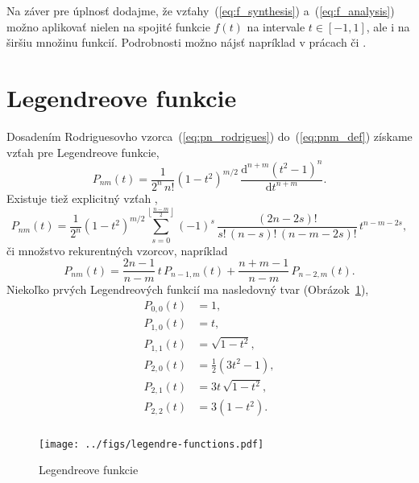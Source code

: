 \documentclass[a4paper, 12pt]{book}
\newcommand{\diff}{\mathrm d}
\begin{document}
Na záver pre úplnosť dodajme, že vzťahy~(\ref{eq:f_synthesis}) 
a~(\ref{eq:f_analysis}) možno aplikovať nielen na spojité funkcie $f(t)$ na 
intervale $t \in [-1, 1]$, ale i na širšiu množinu funkcií.  Podrobnosti možno 
nájsť napríklad v prácach \cite{Freeden2009} či \cite{Arfken2005}.






\section{Legendreove funkcie}
\label{sec:legendre_functions}

Dosadením Rodriguesovho vzorca~(\ref{eq:pn_rodrigues}) do~(\ref{eq:pnm_def}) 
získame vzťah pre Legendreove funkcie,
%
\begin{equation}
\label{eq:pnm_ferrer}
P_{nm}(t) = \frac{1}{2^n \, n!} (1 - t^2)^{ m \slash 2} \, \frac{\diff^{n + m} 
(t^2 - 1)^n}{\diff t^{n + m}}{.}
\end{equation}
%
Existuje tiež explicitný vzťah \citep{Freeden2009},
%
\begin{equation}
P_{nm}(t) = \frac{1}{2^n}(1 - t^2)^{m \slash 2} \sum_{s = 0}^{\left\lfloor 
\frac{n - m}{2} \right\rfloor} (-1)^s \, \frac{(2n - 2s)!}{s! \, (n - s)! \, (n 
- m - 2s)!} \, t^{n - m - 2s}{,}
\end{equation}
%
či
%
množstvo rekurentných vzorcov, napríklad \citep{Freeden2009}
%
\begin{equation}
\label{eq:pnm_recurrence}
P_{nm}(t) = \frac{2n - 1}{n - m} \, t \, P_{n - 1, m}(t) + \frac{n + m - 1}{n 
- m} \, P_{n - 2, m}(t){.}
\end{equation}
%
Niekoľko prvých Legendreových funkcií ma nasledovný tvar 
(Obrázok~\ref{fig:lf}),
%
\begin{equation}
\label{eq:lf00_to_lf22}
\begin{split}
P_{0,0}(t) & = 1{,}\\
P_{1,0}(t) & = t{,}\\
P_{1,1}(t) & = \sqrt{1 - t^2}{,}\\
P_{2,0}(t) & = \frac{1}{2}(3t^2 - 1){,}\\
P_{2,1}(t) & = 3t \, \sqrt{1 - t^2}{,}\\
P_{2,2}(t) & = 3(1 - t^2){.}\\
\end{split}
\end{equation}

\begin{figure}[bt]
\label{fig:lf}
\centering
\texttt{[image: ../figs/legendre-functions.pdf]}
\caption{Legendreove funkcie}
\end{figure}
\end{document}
